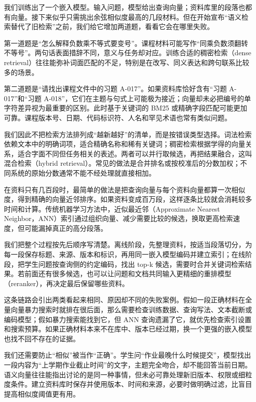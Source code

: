 我们训练出了一个嵌入模型。输入问题，模型给出查询向量；资料库里的段落也都有向量。接下来似乎只需挑出余弦相似度最高的几段材料。但在开始宣布``语义检索替代了旧检索''之前，我们给它增加两道题，看看它会在哪里失败。

第一道题是``怎么解释负数乘不等式要变号''。课程材料可能写作``同乘负数须翻转不等号''。两句话表面措辞不同，意义与任务却对应。训练合适的稠密检索（dense retrieval）往往能弥补词面匹配的不足，特别是在改写、同义表达和跨句联系比较多的场景。

第二道题是``请找出课程文件中的习题 A-017''。如果资料库恰好含有``习题 A-017''和``习题 A-018''，它们在主题与句式上可能极为接近；向量却未必把编号的单字符差异视为最重要的区别。此时基于关键词的 BM25 或精确字段匹配可能更加可靠。课程版本号、日期、代码标识符、人名和罕见术语也常有类似问题。

我们因此不把检索方法排列成``越新越好''的清单，而是按错误类型选择。词法检索依赖文本中的明确词项，适合精确名称和稀有关键词；稠密检索根据学得的向量关系，适合字面不同但任务相关的表述。两者可以并行取候选，再把结果融合，这叫混合检索（hybrid retrieval）。常见的做法是合并排名或按校准后的分数加权；不同系统的原始分数通常不能不经处理就直接相加。

在资料只有几百段时，最简单的做法是把查询向量与每个资料向量都算一次相似度，得到精确的向量近邻排序。如果资料变成百万段，这样逐条比较就会消耗较多时间和计算。传统机器学习方法中，近似最近邻（Approximate Nearest Neighbor，ANN）索引通过组织向量、减少需要比较的候选，换取更高检索速度，但可能漏掉真正的高分段落。

我们把整个过程按先后顺序写清楚。离线阶段，先整理资料，按适当段落切分，为每一段保存标题、来源、版本和标识，再用同一嵌入模型编码并建立索引；在线阶段，把学生问题按查询侧的约定编码，找出 top-k 候选，需要时合并关键词检索结果。若前面还有很多候选，也可以让问题和文档共同输入更精细的重排模型（reranker），再决定最后保留哪些资料。

这条链路会引出两类看起来相同、原因却不同的失败案例。假如一段正确材料在全量向量暴力搜索时就排在很后面，那么需要检查训练数据、查询写法、文本截断或编码模型；假如暴力搜索能找到它，但 ANN 查询遗漏了它，就优先检查索引设置和搜索预算。如果正确材料本来不在库中、版本已经过期，换一个更强的嵌入模型也找不回不存在的证据。

我们还需要防止``相似''被当作``正确''。学生问``作业最晚什么时候提交''，模型找出一段内容为``上学期作业截止时间''的文字，主题完全吻合，却不能回答当前日期。语义向量往往能指出讨论的是同一种事情，但未必可靠处理新旧版本、权限或细粒度条件。建立资料库时保存并使用版本、时间和来源，必要时做明确过滤，比盲目提高相似度阈值更有用。

